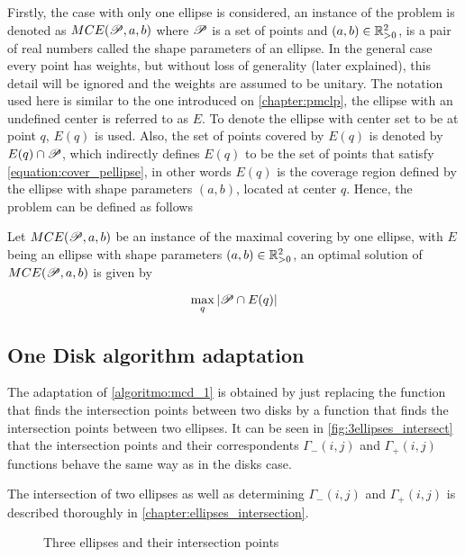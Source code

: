 Firstly, the case with only one ellipse is considered, an instance of the problem is denoted as $MCE(\mathscr{P}, a, b)$ where $\mathscr{P}$ is a set of points and $(a,b) \in \mathbb{R}_{>0}^2$, is a pair of real numbers called the shape parameters of an ellipse. 
In the general case every point has weights, but without loss of generality (later explained), this detail will be ignored and the weights are assumed to be unitary.
The notation used here is similar to the one introduced on \autoref{chapter:pmclp}, the ellipse with an undefined center is referred to as $E$. To denote the ellipse with center set to be at point $q$, $E(q)$ is used. Also, the set of points covered by $E(q)$ is denoted by $E(q) \cap \mathscr{P}$, which indirectly defines $E(q)$ to be the set of points that satisfy \autoref{equation:cover_pellipse}, in other words $E(q)$ is the coverage region defined by the ellipse with shape parameters $(a,b)$, located at center $q$. Hence, the problem can be defined as follows

\begin{definicao}
Let $MCE(\mathscr{P}, a, b)$ be an instance of the maximal covering by one ellipse, with $E$ being an ellipse with shape parameters $(a,b) \in \mathbb{R}_{>0}^2$, an optimal solution of $MCE(\mathscr{P}, a, b)$ is given by

\begin{equation}
    \max_q |\mathscr{P} \cap E(q)|
\end{equation}
\end{definicao}

\subsection{One Disk algorithm adaptation}

The adaptation of \autoref{algoritmo:mcd_1} is obtained by just replacing the function that finds the intersection points between two disks by a function that finds the intersection points between two ellipses.
It can be seen in \autoref{fig:3ellipses_intersect} that the intersection points and their correspondents $\Gamma_-(i,j)$ and $\Gamma_+(i,j)$ functions behave the same way as in the disks case.

The intersection of two ellipses as well as determining $\Gamma_-(i,j)$ and $\Gamma_+(i,j)$ is described thoroughly in \autoref{chapter:ellipses_intersection}. 


\begin{figure}[H]
\centering

    \caption{Three ellipses and their intersection points}
    
    \fautor
    \label{fig:3ellipses_intersect}
\end{figure}

